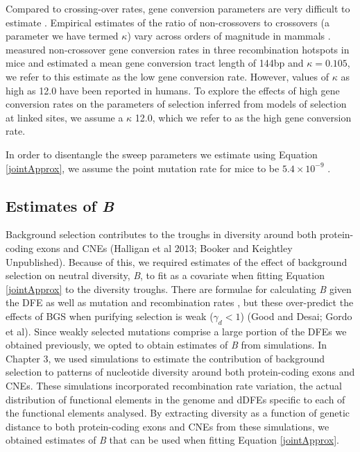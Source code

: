 	Compared to crossing-over rates, gene conversion parameters are very difficult to estimate \citep{RN247}. Empirical estimates of the ratio of non-crossovers  to crossovers (a parameter we have termed $\kappa$) vary across orders of magnitude in mammals \citep{RN247}. \cite{RN263} measured non-crossover gene conversion rates in three recombination hotspots in mice and estimated a mean gene conversion tract length of 144bp and $\kappa = 0.105$, we refer to this estimate as the low gene conversion rate. However, values of $\kappa$ as high as 12.0 have been reported in humans. To explore the effects of high gene conversion rates on the parameters of selection inferred from models of selection at linked sites, we assume a $\kappa$ 12.0, which we refer to as the high gene conversion rate. 

	In order to disentangle the sweep parameters we estimate using Equation \ref{jointApprox}, we assume the point mutation rate for mice to be $5.4 \times 10^{-9}$ \citep{RN228}.	
	
	\subsection*{Estimates of \textit{B}} 
 
 	Background selection contributes to the troughs in diversity around both protein-coding exons and CNEs (Halligan et al 2013; Booker and Keightley Unpublished). Because of this, we required estimates of the effect of background selection on neutral diversity, \textit{B}, to fit as a covariate when fitting Equation \ref{jointApprox} to the diversity troughs. There are formulae for calculating \textit{B} given the DFE as well as mutation and recombination rates \citep{RN157, RN206}, but these over-predict the effects of BGS when purifying selection is weak ($\gamma_d < 1$) (Good and Desai; Gordo et al). Since weakly selected mutations comprise a large portion of the DFEs we obtained previously, we opted to obtain estimates of \textit{B} from simulations. In Chapter 3, we used simulations to estimate the contribution of background selection to patterns of nucleotide diversity around both protein-coding exons and CNEs. These simulations incorporated recombination rate variation, the actual distribution of functional elements in the genome and dDFEs specific to each of the functional elements analysed. By extracting diversity as a function of genetic distance to both protein-coding exons and CNEs from these simulations, we obtained estimates of \textit{B} that can be used when fitting Equation \ref{jointApprox}.
 	
